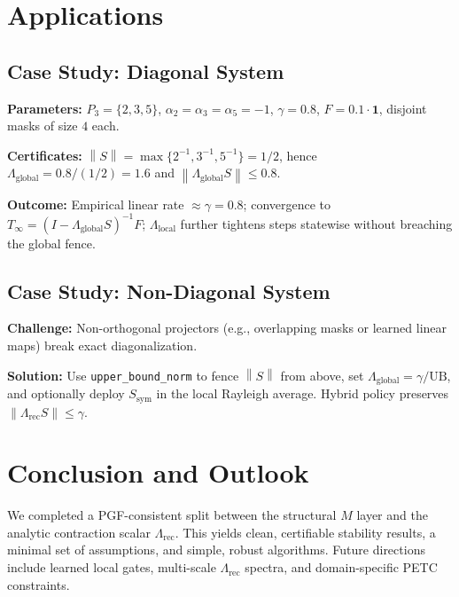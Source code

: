 \documentclass[11pt]{article}
\newcommand{\Lrec}{\Lambda_{\mathrm{rec}}}
\newcommand{\Lglobal}{\Lambda_{\mathrm{global}}}
\newcommand{\Llocal}{\Lambda_{\mathrm{local}}}
\newcommand{\norm}[1]{\left\lVert #1\right\rVert}
\theoremstyle{definition}
\begin{document}
\section{Applications}
\subsection{Case Study: Diagonal System}
\textbf{Parameters:} $P_3=\{2,3,5\}$, $\alpha_2=\alpha_3=\alpha_5=-1$, $\gamma=0.8$, $F=0.1\cdot \mathbf{1}$, disjoint masks of size $4$ each.

\textbf{Certificates:} $\norm{S}=\max\{2^{-1},3^{-1},5^{-1}\}=1/2$, hence $\Lglobal=0.8/(1/2)=1.6$ and $\norm{\Lglobal S}\le 0.8$.

\textbf{Outcome:} Empirical linear rate $\approx \gamma=0.8$; convergence to $T_\infty=(I-\Lglobal S)^{-1}F$; $\Llocal$ further tightens steps statewise without breaching the global fence.

\subsection{Case Study: Non-Diagonal System}
\textbf{Challenge:} Non-orthogonal projectors (e.g., overlapping masks or learned linear maps) break exact diagonalization.

\textbf{Solution:} Use \texttt{upper\_bound\_norm} to fence $\norm{S}$ from above, set $\Lglobal=\gamma/\text{UB}$, and optionally deploy $S_{\mathrm{sym}}$ in the local Rayleigh average. Hybrid policy preserves $\norm{\Lrec S}\le\gamma$.

\section{Conclusion and Outlook}
We completed a PGF-consistent split between the structural $M$ layer and the analytic contraction scalar $\Lrec$. This yields clean, certifiable stability results, a minimal set of assumptions, and simple, robust algorithms. Future directions include learned local gates, multi-scale $\Lrec$ spectra, and domain-specific PETC constraints.

\appendix
\end{document}
